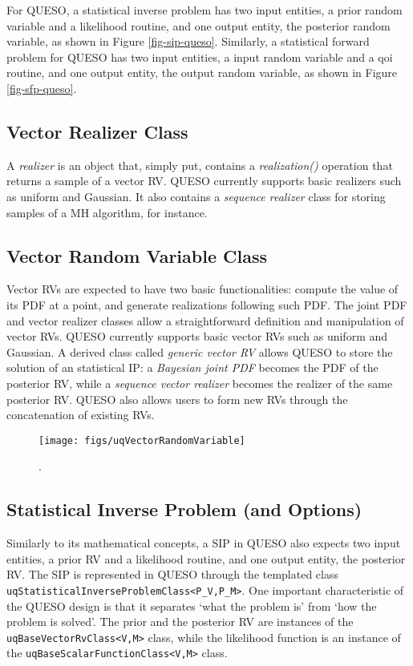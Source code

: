 For QUESO, a statistical inverse problem has two input entities, a prior random variable and
a likelihood routine, and one output entity, the posterior random variable, as shown in Figure \ref{fig-sip-queso}.
%
Similarly, a statistical forward problem for QUESO has two input entities, a input random variable and
a qoi routine, and one output entity, the output random variable, as shown in Figure \ref{fig-sfp-queso}.


\subsection{Vector Realizer Class}
%
A {\it realizer} is an object that, simply put, contains a {\it realization()} operation that returns a sample of a vector RV.
QUESO currently supports basic realizers such as uniform and Gaussian.
It also contains a {\it sequence realizer} class for storing samples of a MH algorithm, for instance.




\subsection{Vector Random Variable Class}
%
Vector RVs are expected to have two basic functionalities:
compute the value of its PDF at a point, and generate realizations following such PDF.
The joint PDF and vector realizer classes allow a straightforward definition and manipulation of vector RVs.
QUESO currently supports basic vector RVs such as uniform and Gaussian.
A derived class called {\it generic vector RV} allows QUESO to store the solution of an statistical IP:
a {\it Bayesian joint PDF} becomes the PDF of the posterior RV, while a {\it sequence vector realizer} becomes the realizer of the same posterior RV.
QUESO also allows users to form new RVs through the concatenation of existing RVs.


\begin{figure}[h!]
\centerline{
\texttt{[image: figs/uqVectorRandomVariable]}
}
\caption{
{\color{red}{The class diagram for the vector random variable class}}.
}
\label{fig-vector-rv-class}
\end{figure}



\subsection{Statistical Inverse Problem (and Options)}
Similarly to its mathematical concepts, a SIP in QUESO also expects two input entities, a prior RV and a likelihood routine, and one output entity, the posterior RV.
The SIP is represented in QUESO through the templated class \verb+uqStatisticalInverseProblemClass<P_V,P_M>+.
One important characteristic of the QUESO design is that it  separates `what the problem is' from `how the problem is solved'.
The prior and the posterior RV are instances of the \verb+uqBaseVectorRvClass<V,M>+ class, while
the likelihood function is an instance of the \verb+uqBaseScalarFunctionClass<V,M>+ class.

